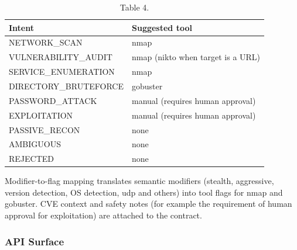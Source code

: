 \documentclass[10pt,journal,onecolumn]{IEEEtran}
\begin{document}
\begin{table}[h]
\caption{Table 4.}
\label{tab:t4}
\begin{tabularx}{\columnwidth}{l >{\raggedright\arraybackslash}X}
\toprule
\textbf{Intent} & \textbf{Suggested tool}\\
\midrule
NETWORK\_SCAN & nmap\\
VULNERABILITY\_AUDIT & nmap (nikto when target is a URL)\\
SERVICE\_ENUMERATION & nmap\\
DIRECTORY\_BRUTEFORCE & gobuster\\
PASSWORD\_ATTACK & manual (requires human approval)\\
EXPLOITATION & manual (requires human approval)\\
PASSIVE\_RECON & none\\
AMBIGUOUS & none\\
REJECTED & none\\
\bottomrule
\end{tabularx}
\end{table}

Modifier-to-flag mapping translates semantic modifiers (stealth, aggressive, version detection, OS detection, udp and others) into tool flags for nmap and gobuster. CVE context and safety notes (for example the requirement of human approval for exploitation) are attached to the contract.

\subsubsection{API Surface}
\end{document}
